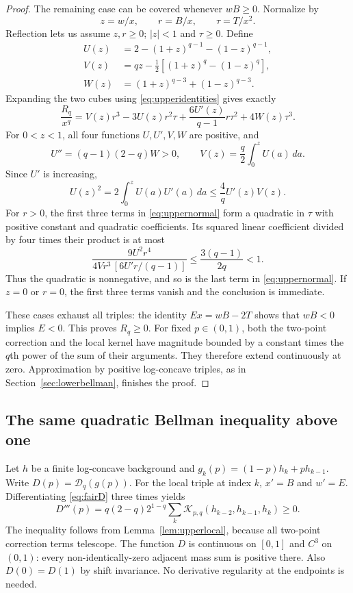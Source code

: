 \documentclass[11pt,a4paper]{amsart}
\numberwithin{equation}{section}
\theoremstyle{remark}
\newcommand{\D}{\mathscr D}
\begin{document}
\begin{proof}
The remaining case can be covered whenever $wB\ge0$. Normalize by
\[
z=w/x,\qquad r=B/x,\qquad \tau=T/x^2.
\]
Reflection lets us assume $z,r\ge0$; $|z|<1$ and $\tau\ge0$.
Define
\begin{align*}
U(z)&=2-(1+z)^{q-1}-(1-z)^{q-1},\\
V(z)&=qz-\tfrac12[(1+z)^q-(1-z)^q],\\
W(z)&=(1+z)^{q-3}+(1-z)^{q-3}.
\end{align*}
Expanding the two cubes using \eqref{eq:upperidentities} gives exactly
\begin{equation}
\frac{R_q}{x^q}=V(z)r^3-3U(z)r^2\tau
 +\frac{6U'(z)}{q-1}r\tau^2+4W(z)\tau^3.
\label{eq:uppernormal}
\end{equation}
For $0<z<1$, all four functions $U,U',V,W$ are positive, and
\[
U''=(q-1)(2-q)W>0,\qquad
V(z)=\frac q2\int_0^zU(a)\,da.
\]
Since $U'$ is increasing,
\begin{equation}
U(z)^2=2\int_0^zU(a)U'(a)\,da
 \le\frac4q U'(z)V(z).
\label{eq:UVbound}
\end{equation}
For $r>0$, the first three terms in \eqref{eq:uppernormal} form a
quadratic in $\tau$ with positive constant and quadratic
coefficients. Its squared linear coefficient divided by four times
their product is at most
\[
\frac{9U^2r^4}{4Vr^3\,[6U'r/(q-1)]}
 \le\frac{3(q-1)}{2q}<1.
\]
Thus the quadratic is nonnegative, and so is the last term in
\eqref{eq:uppernormal}. If $z=0$ or $r=0$, the first three terms
vanish and the conclusion is immediate.

These cases exhaust all triples: the identity $Ex=wB-2T$ shows
that $wB<0$ implies $E<0$. This proves $R_q\ge0$.
For fixed $p\in(0,1)$, both the two-point correction and the local
kernel have magnitude bounded by a constant times the $q$th power
of the sum of their arguments. They therefore extend continuously
at zero. Approximation by positive log-concave triples, as in
Section~\ref{sec:lowerbellman}, finishes the proof.
\end{proof}

\subsection{The same quadratic Bellman inequality above one}

Let $h$ be a finite log-concave background and
$g_k(p)=(1-p)h_k+ph_{k-1}$. Write $D(p)=\D_q(g(p))$.
For the local triple at index $k$, $x'=B$ and $w'=E$.
Differentiating \eqref{eq:fairD} three times yields
\begin{equation}
D'''(p)=q(2-q)2^{1-q}
\sum_k\mathcal K_{p,q}(h_{k-2},h_{k-1},h_k)\ge0.
\label{eq:Dthird}
\end{equation}
The inequality follows from Lemma~\ref{lem:upperlocal}, because all
two-point correction terms telescope. The function $D$ is continuous
on $[0,1]$ and $C^3$ on $(0,1)$: every non-identically-zero
adjacent mass sum is positive there. Also $D(0)=D(1)$ by shift
invariance. No derivative regularity at the endpoints is needed.
\end{document}
